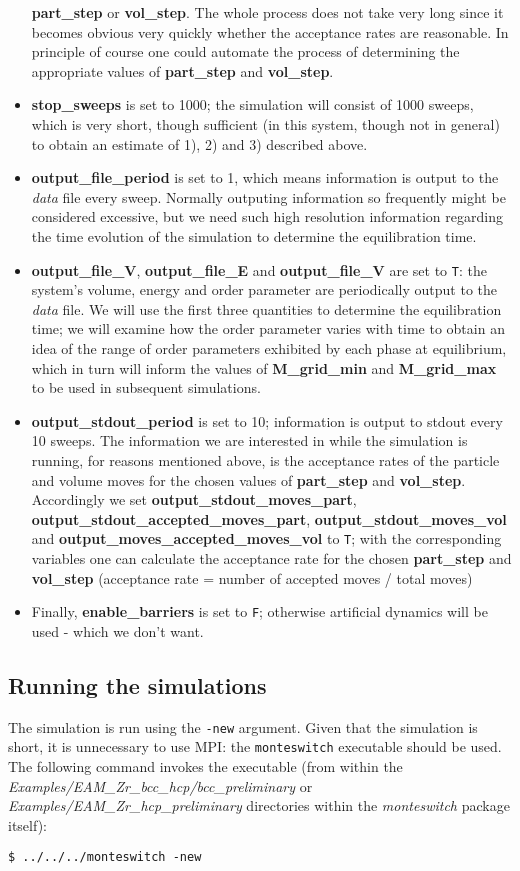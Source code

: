 \documentclass{report}
\begin{document}
\begin{itemize}
  \textbf{part\_step} or \textbf{vol\_step}. The whole process does not take very long since it becomes obvious very quickly whether the acceptance
  rates are reasonable. In principle of course one could automate the process of determining the appropriate values of \textbf{part\_step}
  and \textbf{vol\_step}.
\item \textbf{stop\_sweeps} is set to 1000; the simulation will consist of 1000 sweeps, which is very short, though sufficient (in this system, though
  not in general) to obtain an estimate of 1), 2) and 3) described above. 
\item \textbf{output\_file\_period} is set to 1, which means information is output to the \emph{data} file every sweep. Normally outputing information
  so frequently might be considered excessive, but we need such high resolution information regarding the time evolution of the simulation to 
  determine the equilibration time.
\item \textbf{output\_file\_V}, \textbf{output\_file\_E} and \textbf{output\_file\_V} are set to \texttt{T}: the system's volume, energy and order parameter 
  are periodically output 
  to the \emph{data} file. We will use the first three quantities to determine the equilibration time; we will examine how the order parameter
  varies with time to obtain an idea of the range of order parameters exhibited by each phase at equilibrium, which in turn will inform the
  values of \textbf{M\_grid\_min} and \textbf{M\_grid\_max} to be used in subsequent simulations.
\item \textbf{output\_stdout\_period} is set to 10; information is output to stdout every 10 sweeps. The information we are interested in while the simulation
  is running, for reasons mentioned above, is the acceptance rates of the particle and volume moves for the chosen values of \textbf{part\_step} and 
  \textbf{vol\_step}.
  Accordingly we set \textbf{output\_stdout\_moves\_part}, \textbf{output\_stdout\_accepted\_moves\_part}, \textbf{output\_stdout\_moves\_vol} and 
  \textbf{output\_moves\_accepted\_moves\_vol} to \texttt{T}; with the corresponding variables one can calculate the acceptance rate for the chosen
  \textbf{part\_step} and \textbf{vol\_step} (acceptance rate = number of
  accepted moves / total moves)
\item Finally, \textbf{enable\_barriers} is set to \texttt{F}; otherwise artificial dynamics will be used - which we don't want.
\end{itemize}


\subsection{Running the simulations}
The simulation is run using the \texttt{-new} argument. Given that the simulation is short, it is unnecessary to use MPI: the \texttt{monteswitch} executable
should be used. The following command invokes the executable (from within the \emph{Examples/EAM\_Zr\_bcc\_hcp/bcc\_preliminary} or 
\emph{Examples/EAM\_Zr\_hcp\_preliminary} directories within the \emph{monteswitch} package itself):
\begin{verbatim}
$ ../../../monteswitch -new
\end{verbatim}
\end{document}
